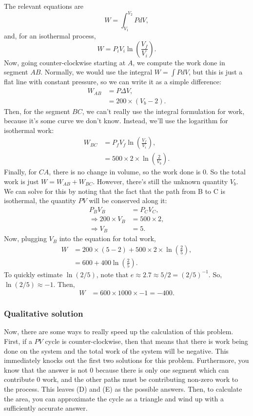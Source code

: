 \documentclass[11pt]{paper}
\begin{document}
The relevant equations are 
\begin{equation}
W = \int_{V_1}^{V_2} P dV,
\end{equation}
and, for an isothermal process,
\begin{equation}
W = P_i V_i \ln\left(\frac{V_f}{V_i}\right).
\end{equation}
Now, going counter-clockwise starting at $A$, we compute the work done in segment $AB$.  Normally, we would use the integral $W = \int P dV$, but this is just a flat line with constant pressure, so we can write it as a simple difference:
\begin{align}
W_{AB} &= P\Delta V,\\
&= 200 \times \left(V_b - 2\right).
\end{align}
Then, for the segment $BC$, we can't really use the integral formulation for work, because it's some curve we don't know.  Instead, we'll use the logarithm for isothermal work:
\begin{align}
W_{BC} &= P_f V_f \ln\left(\frac{V_f}{V_i}\right),\\
&= 500 \times 2 \times \ln \left(\frac{2}{V_b}\right).
\end{align}
Finally, for $CA$, there is no change in volume, so the work done is 0.  So the total work is just $W = W_{AB}+W_{BC}$.  However, there's still the unknown quantity $V_b$.  We can solve for this by noting that the fact that the path from B to C is isothermal, the quantity $PV$ will be conserved along it:
\begin{align}
P_B V_B &= P_C V_C,\\
\Rightarrow 200 \times V_B &= 500 \times 2,\\
\Rightarrow V_B &= 5.
\end{align}
Now, plugging $V_B$ into the equation for total work,
\begin{align}
W &= 200 \times \left(5 - 2\right) + 500 \times 2 \times \ln{\left(\frac{2}{5}\right)}, \\
&= 600 + 400  \ln{\left(\frac{2}{5}\right)}.
\end{align}
To quickly estimate $\ln{\left(2/5\right)}$, note that $e \approx 2.7\approx5/2 = \left(2/5\right)^{-1}$.  So, $\ln{\left(2/5\right)}\approx -1$.  Then,
\begin{align}
W &= 600 \times 1000\times-1 = -400.
\end{align}

\subsubsection*{Qualitative solution}
Now, there are some ways to really speed up the calculation of this problem.  First, if a $PV$ cycle is counter-clockwise, then that means that there is work being done on the system and the total work of the system will be negative.  This immediately knocks out the first two solutions for this problem.  Furthermore, you know that the answer is not 0 because there is only one segment which can contribute 0 work, and the other paths must be contributing non-zero work to the process.  This leaves (D) and (E) as the possible answers.  Then, to calculate the area, you can approximate the cycle as a triangle and wind up with a sufficiently accurate answer.
\end{document}
